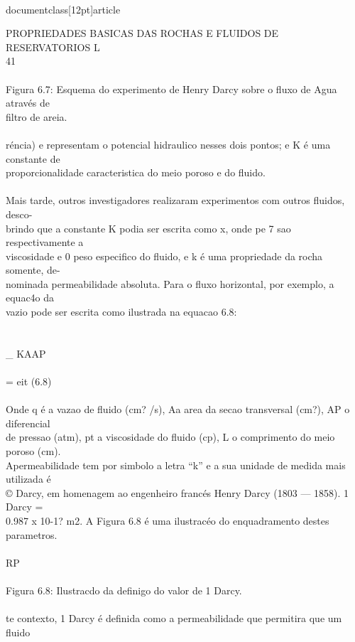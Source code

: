 \\documentclass[12pt]{article}
\begin{document}
PROPRIEDADES BASICAS DAS ROCHAS E FLUIDOS DE RESERVATORIOS L\\
41\\
\\
Figura 6.7: Esquema do experimento de Henry Darcy sobre o fluxo de Agua através de\\
filtro de areia.\\
\\
réncia) e representam o potencial hidraulico nesses dois pontos; e K é uma constante de\\
proporcionalidade caracteristica do meio poroso e do fluido.\\
\\
Mais tarde, outros investigadores realizaram experimentos com outros fluidos, desco-\\
brindo que a constante K podia ser escrita como x, onde pe 7 sao respectivamente a\\
viscosidade e 0 peso especifico do fluido, e k é uma propriedade da rocha somente, de-\\
nominada permeabilidade absoluta. Para o fluxo horizontal, por exemplo, a equac4o da\\
vazio pode ser escrita como ilustrada na equacao 6.8:\\
\\
\\_ KAAP\\
\\
= eit (6.8)\\
\\
Onde q é a vazao de fluido (cm? /s), Aa area da secao transversal (cm?), AP o diferencial\\
de pressao (atm), pt a viscosidade do fluido (cp), L o comprimento do meio poroso (cm).\\
Apermeabilidade tem por simbolo a letra “k” e a sua unidade de medida mais utilizada é\\
© Darcy, em homenagem ao engenheiro francés Henry Darcy (1803 — 1858). 1 Darcy =\\
0.987 x 10-1? m2. A Figura 6.8 é uma ilustracéo do enquadramento destes parametros.\\
\\
RP\\
\\
Figura 6.8: Ilustracdo da definigo do valor de 1 Darcy.\\
\\
te contexto, 1 Darcy é definida como a permeabilidade que permitira que um fluido\\
\end{document}
